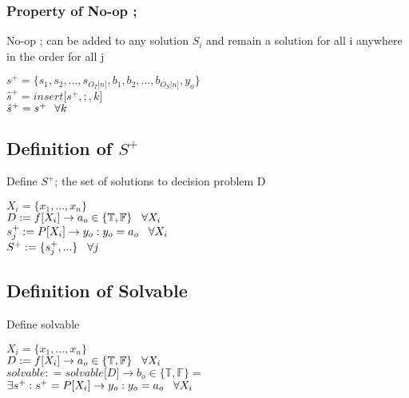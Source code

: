 \documentclass[11pt]{article}
\begin{document}
\subsubsection{Property of No-op ;}
No-op ; can be added to any solution $S_i$ and remain a solution for all i anywhere in the order for all j
\begin{center}
$
s^+ = \{ s_1,s_2,...,s_{O_T \lbrack n \rbrack }, b_1, b_2,...,b_{O_S \lbrack n \rbrack},y_o\}
$
\\ \vspace{2mm}
$
\hat{s}^+ = insert \lbrack s^+,;,k \rbrack
$
\\ \vspace{2mm}
$
\hat{s}^+ = s^+ \hspace{2.5mm} \forall k
$
\end{center}





\subsection{Definition of $S^+$}
Define $S^+$; the set of solutions to decision problem D
\begin{center}
$
X_i = \{x_1,...,x_n\}
$
\\ \vspace{2mm}
$
D := f \lbrack X_i \rbrack \rightarrow a_{o} \in \{\mathbb{T}, \mathbb{F}\} \hspace{3mm} \forall X_i
$
\\ \vspace{2mm}
$
s_j^+ := P \lbrack X_i \rbrack \rightarrow y_{o} : y_o = a_{o} \hspace{3mm} \forall X_i
$
\\ \vspace{2mm}
$
S^+ := \{s^+_j,...\} \hspace{3mm} \forall j
$
\end{center}





\subsection{Definition of Solvable}
Define solvable
\begin{center}
$
X_i = \{x_1,...,x_n\}
$
\\ \vspace{2mm}
$
D := f \lbrack X_i \rbrack \rightarrow a_{o} \in \{\mathbb{T}, \mathbb{F}\} \hspace{3mm} \forall X_i
$
\\ \vspace{2mm}
$solvable : = solvable \lbrack D \rbrack \rightarrow b_o \in \{ \mathbb{T}, \mathbb{F} \} =$
\\ \vspace{2mm}
$\exists s^+ : s^+ = P \lbrack X_i \rbrack \rightarrow y_{o} : y_o = a_{o} \hspace{3mm} \forall X_i$
\end{center}
\end{document}
